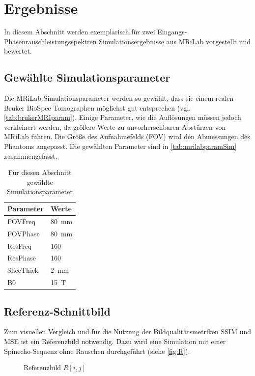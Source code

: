 \chapter{Ergebnisse}
In diesem Abschnitt werden exemplarisch für zwei Eingangs-Phasenrauschleistungsspektren Simulationsergebnisse aus MRiLab vorgestellt und bewertet.

\section{Gewählte Simulationsparameter}
Die MRiLab-Simulationsparameter werden so gewählt, dass sie einem realen Bruker BioSpec Tomographen möglichst gut entsprechen (vgl. \autoref{tab:brukerMRIparam}). Einige Parameter, wie die Auflösungen müssen jedoch verkleinert werden, da größere Werte zu unvorhersehbaren Abstürzen von MRiLab führen. Die Größe des Aufnahmefelds (FOV) wird den Abmessungen des Phantoms angepasst. Die gewählten Parameter sind in \autoref{tab:mrilabparamSim} zusammengefasst.

\begin{table}[H]
	\centering
	\caption[gewählte Simulationsparameter]{Für diesen Abschnitt gewählte Simulationsparameter}
	\label{tab:mrilabparamSim}
	\begin{tabularx}{0.5\textwidth}{lX}
		\toprule
		\textbf{Parameter} & \textbf{Werte}\\
		\midrule
		FOVFreq    & \SI{80}{\mm}\\
		FOVPhase   & \SI{80}{\mm}\\
		ResFreq    & 160\\
		ResPhase   & 160\\
		SliceThick & \SI{2}{\mm}\\
		B0         & \SI{15}{\tesla} \\
		\bottomrule
		\end{tabularx}
		\end{table}

\section{Referenz-Schnittbild}
Zum visuellen Vergleich und für die Nutzung der Bildqualitätsmetriken SSIM und MSE ist ein Referenzbild notwendig. Dazu wird eine Simulation mit einer Spinecho-Sequenz ohne Rauschen durchgeführt (siehe \autoref{fig:R}).

\begin{figure}[H]
	\centering
	\caption[Referenzbild]{Referenzbild $R[i,j]$}
	\label{fig:R}
\end{figure}

